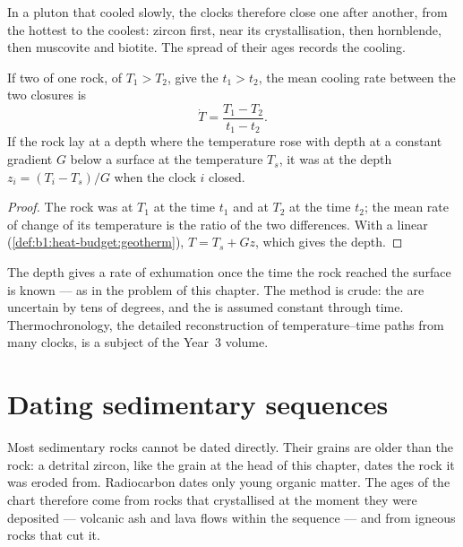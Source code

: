 In a pluton that cooled slowly, the clocks therefore close one after another,
from the hottest to the coolest: zircon first, near its crystallisation, then
hornblende, then muscovite and biotite. The spread of their ages records the
cooling.

\begin{proposition}\label{prop:b1:radiometric-methods:cooling}
If two  of one rock, of  $T_1 > T_2$, give the  $t_1 > t_2$, the mean cooling rate between the two closures is
\[
  \dot T = \frac{T_1 - T_2}{t_1 - t_2}.
\]
If the rock lay at a depth where the temperature rose with depth at a constant
gradient $G$ below a surface at the temperature $T_s$, it was at the depth $z_i
= (T_i - T_s)/G$ when the clock $i$ closed.
\end{proposition}

\begin{proof}
The rock was at $T_1$ at the time $t_1$ and at $T_2$ at the time $t_2$; the mean
rate of change of its temperature is the ratio of the two differences. With a
linear  (\cref{def:b1:heat-budget:geotherm}), $T = T_s + G z$, which
gives the depth.
\end{proof}

The depth gives a rate of exhumation once the time the rock reached the surface
is known --- as in the problem of this chapter. The method is crude: the
 are uncertain by tens of degrees, and the  is
assumed constant through time. Thermochronology, the
detailed reconstruction of temperature--time paths from many clocks, is a subject
of the Year~3 volume.

\section{Dating sedimentary sequences}\label{sec:b1:radiometric-methods:sediments}

Most sedimentary rocks cannot be dated directly. Their grains are older than the
rock: a detrital zircon, like the grain at the head of this chapter, dates the
rock it was eroded from. Radiocarbon dates only young organic matter. The ages
of the chart therefore come from rocks that crystallised at the moment they
were deposited --- volcanic ash and lava flows within the sequence --- and from
igneous rocks that cut it.

